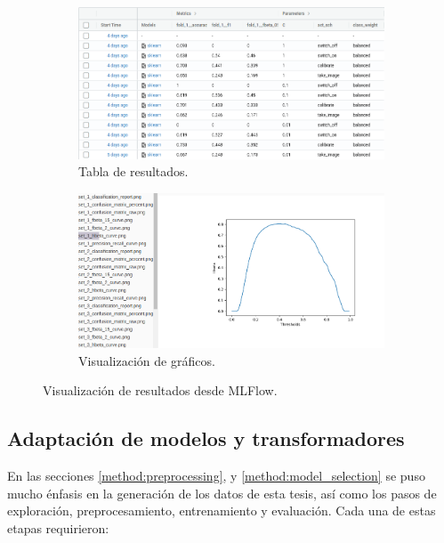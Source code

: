  \begin{figure}[t!]
    \begin{subfigure}[b]{\textwidth}
        \centering
        \includegraphics[width=\linewidth]{figures/runs_example_1.png}
        \caption{Tabla de resultados.}
    \end{subfigure}
    \hfill
    \begin{subfigure}[b]{\textwidth}
        \centering
        \includegraphics[width=\linewidth]{figures/runs_example_2.png}
        \caption{Visualización de gráficos.}
    \end{subfigure}
    \caption{Visualización de resultados desde MLFlow.}
    \label{fig:mlflow-runs}
\end{figure}

\subsection{Adaptación de modelos y transformadores}

En las secciones \ref{method:preprocessing}, y \ref{method:model_selection} se
puso mucho énfasis en la generación de los datos de esta tesis, así como los
pasos de exploración, preprocesamiento, entrenamiento y evaluación. Cada una de
estas etapas requirieron:

